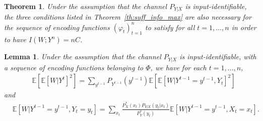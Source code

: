 \documentclass[10pt,a4paper]{amsart}
\newtheorem{theorem}{Theorem}
\newtheorem{lemma}{Lemma}
\newcommand{\E}{\mathbb{E}}
\begin{document}
\begin{theorem}\label{th:nece_info_max}
Under the assumption that the channel $P_{Y|X}$ is input-identifiable, the three conditions listed in Theorem~\ref{th:suff_info_max} are also necessary for the sequence of encoding functions $(\varphi_t)_{t=1}^n$ to satisfy for all $t=1,\ldots,n$ in order to have $I(W;Y^n) = nC$.
\end{theorem}

\begin{lemma}\label{lm:E[W|Y]}
Under the assumption that the channel $P_{Y|X}$ is input-identifiable, with a sequence of encoding functions belonging to $\mathsf\Phi$, we have for each $t=1,\ldots,n$,
\begin{align}
& \E[\E[W|Y^{t}]^2] 
=\sum_{y^{t-1}}P_{Y^{t-1}}(y^{t-1}) \E[\E[W|Y^{t-1}=y^{t-1}, Y_t]^2] \label{eq:lm_E[W|Yt]_1}
\end{align}
and
\begin{align}
& \E[W|Y^{t-1}=y^{t-1}, Y_t = y_t] = 
\sum_{x_t}\frac{P_{X}^*(x_t) P_{Y|X}(y_t|x_t)}{P_{Y}^*(y_t)} \E[W|Y^{t-1}=y^{t-1}, X_t=x_t] . \label{eq:lm_E[W|Yt]_2}
\end{align}
\end{lemma}
\end{document}
